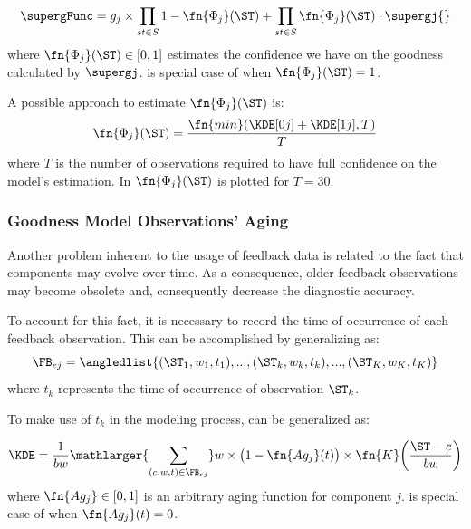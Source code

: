 \begin{equation}
  \label{eq:conclusions:supergFunc}
  \supergFunc = g_j \times \prod_{st \in S} 1 - \fn{\Phi_j}(\ST)  + \prod_{st \in S} \fn{\Phi_j}(\ST) \cdot \supergj{}
\end{equation}
\noindent
where $\fn{\Phi_j}(\ST) \in [0,1]$ estimates the confidence we have on the
goodness calculated by $\supergj$.
%
 is special case of
 when $\fn{\Phi_j}(\ST) = 1$.

A possible approach to estimate $\fn{\Phi_j}(\ST)$ is:
\begin{equation}
  \fn{\Phi_j}(\ST) = \frac{\fn{min}(\KDE[0j] + \KDE[1j], T)}{T}
\end{equation}
\noindent
where $T$ is the number of observations required to have full
confidence on the model's estimation.
%
In  $\fn{\Phi_j}(\ST)$ is
plotted for $T=30$.

\subsubsection*{Goodness Model Observations' Aging}
Another problem inherent to the usage of feedback data is related to
the fact that components may evolve over time.
%
As a consequence, older feedback observations may become obsolete and,
consequently decrease the diagnostic accuracy.

To account for this fact, it is necessary to record the time of
occurrence of each feedback observation.
%
This can be accomplished by generalizing
 as:
\begin{equation}
  \FB_{ej} = \angledlist{(\ST_1, w_1, t_1), ...,  (\ST_k, w_k, t_k), ..., (\ST_K,w_K,t_K)}
\end{equation}
\noindent
where $t_k$ represents the time of occurrence of observation $\ST_k$.

To make use of $t_k$ in the modeling process,
 can be generalized as:

\begin{equation}
  \label{eq:conclusions:supergFuncII}
  \KDE = \frac {1}{bw}{\mathlarger{\sum_{(c, w, t) \in \FB_{ej}}} w\times \big(1 - \fn{Ag_{j}}(t)\big)\times\fn{K}\bigg(\frac{\ST - c}{bw}\bigg)}
\end{equation}
\noindent
where $\fn{Ag_{j}} \in [0,1]$ is an arbitrary aging function for
component $j$.
%
 is special case of
 when $\fn{Ag_j}(t) = 0$.

